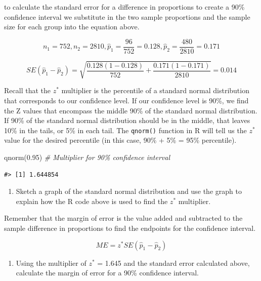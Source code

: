 \documentclass[
]{report}
\newenvironment{Shaded}{\begin{snugshade}}{\end{snugshade}}
\newcommand{\CommentTok}[1]{\textcolor[rgb]{0.56,0.35,0.01}{\textit{#1}}}
\newcommand{\FloatTok}[1]{\textcolor[rgb]{0.00,0.00,0.81}{#1}}
\newcommand{\FunctionTok}[1]{\textcolor[rgb]{0.00,0.00,0.00}{#1}}
\newcommand{\NormalTok}[1]{#1}
\providecommand{\tightlist}{%
  \setlength{\itemsep}{0pt}\setlength{\parskip}{0pt}}
\begin{document}
to calculate the standard error for a difference in proportions to create a 90\% confidence interval we substitute in the two sample proportions and the sample size for each group into the equation above.

\[n_1 = 752, n_2 = 2810, \hat{p}_1 = \frac{96}{752} = 0.128, \hat{p}_2 = \frac{480}{2810} = 0.171\]

\[SE(\hat{p}_1-\hat{p}_2) = \sqrt{\frac{0.128 (1-0.128)}{752}+\frac{0.171 (1-0.171)}{2810}} = 0.014\]

Recall that the \(z^*\) multiplier is the percentile of a standard normal distribution that corresponds to our confidence level. If our confidence level is 90\%, we find the Z values that encompass the middle 90\% of the standard normal distribution. If 90\% of the standard normal distribution should be in the middle, that leaves 10\% in the tails, or 5\% in each tail. The \texttt{qnorm()} function in R will tell us the \(z^*\) value for the desired percentile (in this case, 90\% + 5\% = 95\% percentile).

\begin{Shaded}
\begin{Highlighting}[]
\FunctionTok{qnorm}\NormalTok{(}\FloatTok{0.95}\NormalTok{) }\CommentTok{\# Multiplier for 90\% confidence interval}
\end{Highlighting}
\end{Shaded}

\begin{verbatim}
#> [1] 1.644854
\end{verbatim}

\newpage

\begin{enumerate}
\def\labelenumi{\arabic{enumi}.}
\setcounter{enumi}{2}
\tightlist
\item
  Sketch a graph of the standard normal distribution and use the graph to explain how the R code above is used to find the \(z^*\) multiplier.
\end{enumerate}

\vspace{1.5in}

Remember that the margin of error is the value added and subtracted to the sample difference in proportions to find the endpoints for the confidence interval.

\[ME = z^*SE(\hat{p}_1 - \hat{p}_2)\]

\begin{enumerate}
\def\labelenumi{\arabic{enumi}.}
\setcounter{enumi}{3}
\tightlist
\item
  Using the multiplier of \(z^*\) = 1.645 and the standard error calculated above, calculate the margin of error for a 90\% confidence interval.
\end{enumerate}
\end{document}
